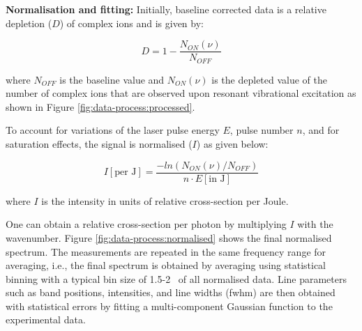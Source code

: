 \textbf{Normalisation and fitting:} Initially, baseline corrected data is a relative depletion ($D$) of complex ions and is given by:

\[ D= 1 - \frac{N_{ON}(\nu)}{N_{OFF}} \] 

where $N_{OFF}$ is the baseline value and $N_{ON}(\nu)$ is the depleted value of the number of complex ions that are observed upon resonant vibrational excitation as shown in Figure \ref{fig:data-process:processed}.

To account for variations of the laser pulse energy $E$, pulse number $n$, and for saturation effects, the signal is normalised ($I$) as given below: 

\[ I [\text{per J}]=\frac{- ln(N_{ON}(\nu)/N_{OFF})}{n \cdot E[\text{in J}]} \]

where $I$ is the intensity in units of relative cross-section per Joule. 

One can obtain a relative cross-section per photon by multiplying $I$ with the wavenumber. Figure \ref{fig:data-process:normalised} shows the final normalised spectrum. The measurements are repeated in the same frequency range for averaging, i.e., the final spectrum is obtained by averaging using statistical binning with a typical bin size of 1.5-2 \wn\ of all normalised data. Line parameters such as band positions, intensities, and line widths (fwhm) are then obtained with statistical errors by fitting a multi-component Gaussian function to the experimental data. 

